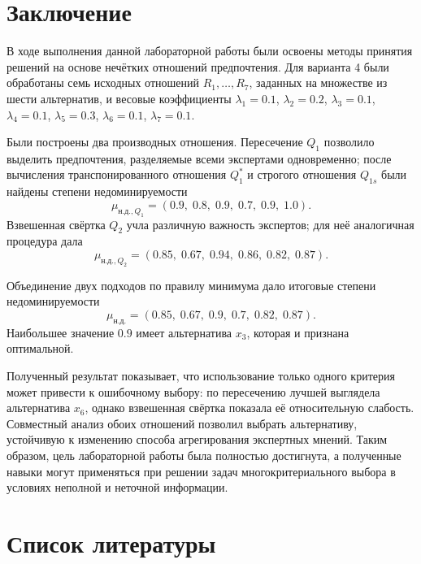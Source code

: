 \clearpage

\section{Заключение}

В ходе выполнения данной лабораторной работы были освоены методы принятия решений на основе нечётких отношений предпочтения. Для варианта 4 были обработаны семь исходных отношений $R_1, \ldots, R_7$, заданных на множестве из шести альтернатив, и весовые коэффициенты $\lambda_1 = 0.1$, $\lambda_2 = 0.2$, $\lambda_3 = 0.1$, $\lambda_4 = 0.1$, $\lambda_5 = 0.3$, $\lambda_6 = 0.1$, $\lambda_7 = 0.1$.

Были построены два производных отношения. Пересечение $Q_1$ позволило выделить предпочтения, разделяемые всеми экспертами одновременно; после вычисления транспонированного отношения $Q_1^{*}$ и строгого отношения $Q_{1s}$ были найдены степени недоминируемости
\[
\mu_{\text{н.д.},Q_1} = (0.9,\; 0.8,\; 0.9,\; 0.7,\; 0.9,\; 1.0).
\]
Взвешенная свёртка $Q_2$ учла различную важность экспертов; для неё аналогичная процедура дала
\[
\mu_{\text{н.д.},Q_2} = (0.85,\; 0.67,\; 0.94,\; 0.86,\; 0.82,\; 0.87).
\]

Объединение двух подходов по правилу минимума дало итоговые степени недоминируемости
\[
\mu_{\text{н.д.}} = (0.85,\; 0.67,\; 0.9,\; 0.7,\; 0.82,\; 0.87).
\]
Наибольшее значение $0.9$ имеет альтернатива $x_3$, которая и признана оптимальной.

Полученный результат показывает, что использование только одного критерия может привести к ошибочному выбору: по пересечению лучшей выглядела альтернатива $x_6$, однако взвешенная свёртка показала её относительную слабость. Совместный анализ обоих отношений позволил выбрать альтернативу, устойчивую к изменению способа агрегирования экспертных мнений. Таким образом, цель лабораторной работы была полностью достигнута, а полученные навыки могут применяться при решении задач многокритериального выбора в условиях неполной и неточной информации.

\clearpage

\section{Список литературы}

